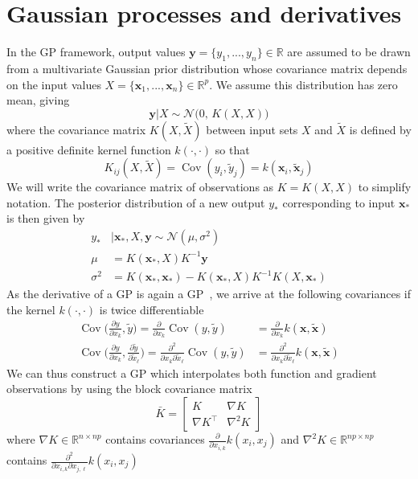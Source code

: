 \documentclass{article}
\newcommand{\mat}[1]{\begin{bmatrix}#1\end{bmatrix}}
\renewcommand{\vec}[1]{\mathbf{#1}}
\newcommand{\R}{\mathbb{R}}
\newcommand{\N}{\mathcal{N}}
\DeclareMathOperator{\Cov}{Cov}
\numberwithin{equation}{section}
\begin{document}
\section{Gaussian processes and derivatives}
In the GP framework, output values $\vec{y} = \{y_1,...,y_n\} \in \R$ are assumed to be drawn from a multivariate Gaussian prior distribution whose covariance matrix depends on the input values $X = \{\vec{x}_1,...,\vec{x}_n\} \in \R^p$. We assume this distribution has zero mean, giving
$$ \vec{y} | X \sim \N\Big(0, \, K(X,X)\Big) $$
where the covariance matrix $K(X,\tilde{X})$ between input sets $X$ and $\tilde{X}$ is defined by a positive definite kernel function $k(\cdot, \cdot)$ so that
$$K_{ij}(X,\tilde{X}) = \Cov(y_i, \tilde{y}_j) = k(\vec{x}_i, \tilde{\vec{x}}_j)$$
We will write the covariance matrix of observations as $K = K(X,X)$ to simplify notation. The posterior distribution of a new output $y_*$ corresponding to input $\vec{x}_*$ is then given by
\begin{align*}
    y_* &| \vec{x}_*,X,\vec{y} \sim \N(\mu, \sigma^2) \\
    \mu & = K(\vec{x}_*, X)K^{-1}\vec{y} \label{eq:posterior-mean} \\
    \sigma^2 & = K(\vec{x}_*, \vec{x}_*) - K(\vec{x}_*, X)K^{-1}K(X, \vec{x}_*) \label{eq:posterior-var}
\end{align*}
As the derivative of a GP is again a GP~\cite{bernardo1992some}, we arrive at the following covariances if the kernel $k(\cdot, \cdot)$ is twice differentiable
\begin{align*}
    \Cov\Big(\frac{\partial y}{\partial x_k}, \tilde{y}\Big)
    = \frac{\partial}{\partial x_k} \Cov(y, \tilde{y})
    &= \frac{\partial}{\partial x_k} k(\vec{x}, \tilde{\vec{x}}) \\
    \Cov\Big(\frac{\partial y}{\partial x_k}, \frac{\partial\tilde{y}}{\partial \tilde{x}_\ell}\Big)
    = \frac{\partial^2}{\partial x_k \partial \tilde{x}_\ell} \Cov(y, \tilde{y})
    &= \frac{\partial^2}{\partial x_k \partial \tilde{x}_\ell} k(\vec{x}, \tilde{\vec{x}})
\end{align*}
We can thus construct a GP which interpolates both function and gradient observations by using the block covariance matrix
$$ \bar{K} = \mat{K & \nabla K \\ \nabla K^\top & \nabla^2 K} $$
where $\nabla K \in \R^{n \times np}$ contains covariances $\frac{\partial}{\partial x_{i,k}} k(x_i, x_j)$ and $\nabla^2 K \in \R^{np \times np}$ contains $\frac{\partial^2}{\partial x_{i,k} \partial x_{j,\ell}} k(x_i, x_j)$
\end{document}
